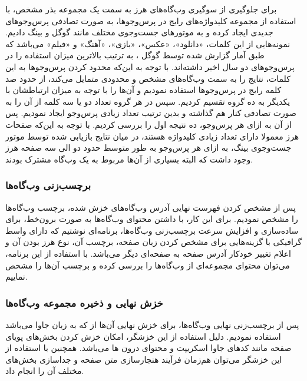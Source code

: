 \documentclass[twoside, a4paper,11pt]{book}
\numberwithin{equation}{chapter}
\numberwithin{table}{chapter}
\numberwithin{figure}{chapter}
\numberwithin{equation}{chapter}
\begin{document}
برای جلوگیری از سوگیری وب‌گاه‌های هرز به سمت یک مجموعه بذر مشخص، با استفاده از مجموعه کلیدواژه‌های رایج در پرس‌وجوها، به صورت تصادفی پرس‌وجوهای جدیدی ایجاد کرده و به موتورهای جست‌و‌جوی مختلف مانند گوگل و بینگ دادیم. نمونه‌هایی از این کلمات،  «دانلود»، «عکس»، «بازی»، «آهنگ» و «فیلم» می‌باشد که طبق آمار گزارش شده توسط گوگل ، به ترتیب بالاترین میزان استفاده را  در پرس‌وجو‌های دو سال اخیر داشته‌اند. با توجه به این‌که محدود کردن پرس‌وجو‌ها به این کلمات، نتایج را به سمت وب‌گاه‌های مشخص و محدودی متمایل می‌کند، از حدود صد کلمه رایج در پرس‌وجوها استفاده نمودیم و آن‌ها را  با توجه به میزان ارتباطشان با یکدیگر به ده گروه تقسیم کردیم. سپس در هر گروه تعداد دو یا سه کلمه از آن را به صورت تصادفی کنار هم گذاشته و بدین ترتیب تعداد زیادی پرس‌وجو ایجاد نمودیم. 
پس از آن به ازای هر پرس‌وجو، ده نتیجه اول را بررسی کردیم. با توجه به این‌که صفحات هرز معمولا دارای تعداد زیادی کلیدواژه هستند، در میان نتایج بازیابی شده توسط موتور جست‌وجوی  بینگ، به ازای هر پرس‌و‌جو به طور متوسط حدود دو الی سه صفحه هرز وجود داشت که البته بسیاری از آن‌ها مربوط به یک وب‌گاه مشترک بودند. 

\subsubsection{برچسب‌زنی وب‌گاه‌ها}
پس از مشخص کردن فهرست نهایی آدرس وب‌گاه‌های خزش شده، برچسب وب‌گاه‌ها را مشخص نمودیم. برای این کار، با داشتن محتوای وب‌گاه‌ها به صورت برون‌خط، برای ساده‌سازی و افزایش سرعت برچسب‌زنی وب‌گاه‌ها، برنامه‌ای نوشتیم که دارای واسط گرافیکی با گزینه‌هایی برای مشخص کردن زبان صفحه، برچسب آن، نوع هرز بودن آن و اعلام تغییر خودکار آدرس صفحه به صفحه‌ای دیگر می‌باشد. با استفاده از این برنامه،‌ می‌توان محتوای مجموعه‌ای از وب‌گاه‌ها را بررسی کرده و برچسب آن‌ها را مشخص نماییم. 

\subsubsection{خزش نهایی و ذخیره مجموعه وب‌گاه‌ها}
پس از برچسب‌زنی نهایی وب‌گاه‌ها، برای خزش نهایی آن‌ها از   که به زبان جاوا می‌باشد استفاده نمودیم. دلیل استفاده از این خزشگر، امکان خزش کردن بخش‌های پویای صفحه مانند کدهای جاوا اسکریپت و محتوای درون ها می‌باشد. 
همچنین با استفاده از این خزشگر می‌توان هم‌زمان فرآیند هنجارسازی متن صفحه و جداسازی بخش‌های مختلف آن را انجام داد. 
\end{document}
